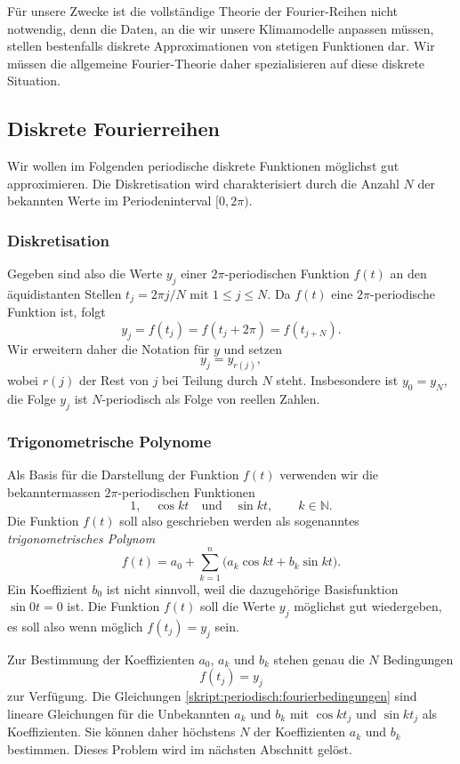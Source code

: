 Für unsere Zwecke ist die vollständige Theorie der Fourier-Reihen nicht
notwendig, denn die Daten, an die wir unsere Klimamodelle anpassen
müssen, stellen bestenfalls diskrete Approximationen von stetigen
Funktionen dar.
Wir müssen die allgemeine Fourier-Theorie daher spezialisieren auf diese
diskrete Situation.

\subsection{Diskrete Fourierreihen}
Wir wollen im Folgenden periodische diskrete Funktionen möglichst gut
approximieren.
Die Diskretisation wird charakterisiert durch die Anzahl
$N$ der bekannten Werte im Periodeninterval $[0,2\pi)$.

\subsubsection{Diskretisation}
Gegeben sind also die Werte $y_j$ einer $2\pi$-periodischen Funktion
$f(t)$ an den äquidistanten Stellen $t_j=2\pi j/N$ mit
$1\le j \le N$.
Da $f(t)$ eine $2\pi$-periodische Funktion ist, folgt
\[
y_j = f(t_j) = f(t_j+2\pi) = f(t_{j+N}).
\]
Wir erweitern daher die Notation für $y$ und setzen
\[
y_j = y_{r(j)},
\]
wobei $r(j)$ der Rest von $j$ bei Teilung durch $N$ steht.
Insbesondere ist $y_0=y_N$, die Folge $y_j$ ist $N$-periodisch als
Folge von reellen Zahlen.

\subsubsection{Trigonometrische Polynome}
Als Basis für die Darstellung der Funktion $f(t)$ verwenden wir
die bekanntermassen
$2\pi$-periodischen Funktionen 
\begin{equation}
1,\quad \cos kt\quad\text{und}\quad \sin kt,\qquad k\in\mathbb N.
\end{equation}
Die Funktion $f(t)$ soll also geschrieben werden als sogenanntes 
{\em trigonometrisches Polynom}
%
\begin{equation}
f(t)
=
a_0 + \sum_{k=1}^n \bigl(a_k \cos kt + b_k\sin kt).
\label{skript:fourier:rekonstruktion}
\end{equation}
Ein Koeffizient $b_0$ ist nicht sinnvoll, weil die dazugehörige Basisfunktion
$\sin 0t =0$ ist.
Die Funktion $f(t)$ soll die Werte $y_j$
möglichst gut wiedergeben, es soll also wenn möglich $f(t_j) = y_j$ sein.

Zur Bestimmung der Koeffizienten $a_0$, $a_k$ und $b_k$ stehen genau
die $N$ Bedingungen
\begin{equation}
f(t_j)=y_j
\label{skript:periodisch:fourierbedingungen}
\end{equation}
zur Verfügung.
Die Gleichungen \eqref{skript:periodisch:fourierbedingungen} sind
lineare Gleichungen für die Unbekannten $a_k$ und $b_k$ mit
$\cos kt_j$ und $\sin kt_j$ als Koeffizienten.
Sie können daher höchstens $N$ der Koeffizienten $a_k$ und $b_k$
bestimmen.
Dieses Problem wird im nächsten Abschnitt gelöst.

